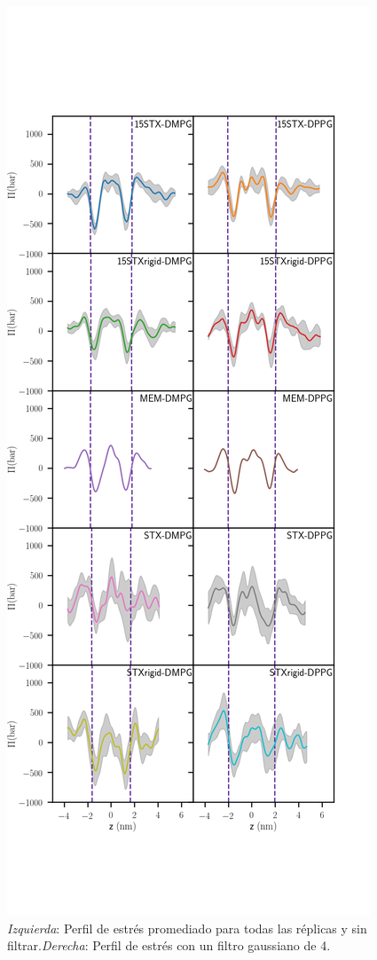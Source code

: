 \begin{appendix}
\begin{figure}[h]
\begin{center}
        \includegraphics[scale=0.22,trim={0 6cm 0 8cm},clip]{Plots/stress_profile_4.png}
  \caption{\textit{Izquierda}: Perfil de estr\'{e}s promediado para todas las r\'{e}plicas y sin filtrar.\textit{Derecha}: Perfil de estr\'{e}s con un filtro gaussiano de 4. }
  \label{fig:stress0}
\end{center}
\end{figure}


\end{appendix}
